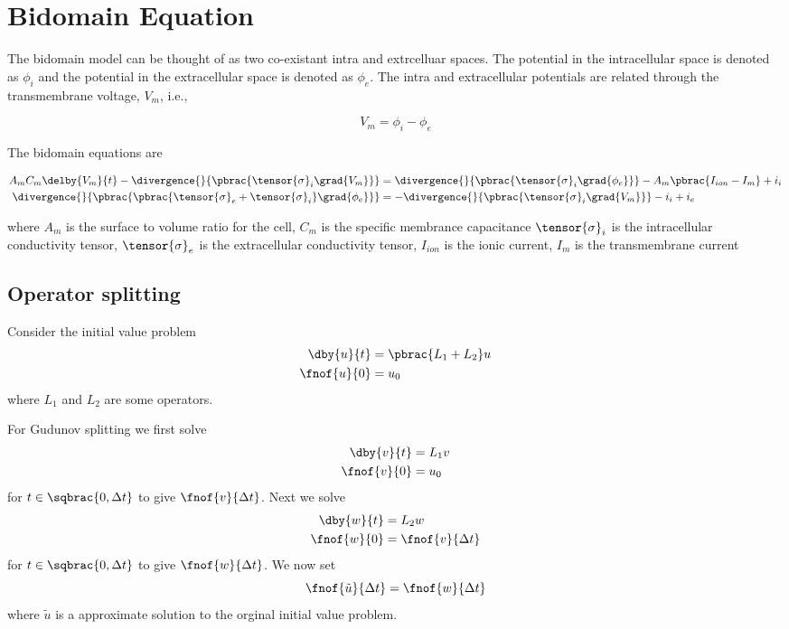 \section{Bidomain Equation}
\label{sec:Bidomain}

The bidomain model can be thought of as two co-existant intra and extrcelluar
spaces. The potential in the intracellular space is denoted as
$\phi_{i}$ and the potential in the extracellular space is denoted as
$\phi_{e}$. The intra and extracellular potentials are related through the
transmembrane voltage, $V_{m}$, i.e.,

\begin{equation}
  V_{m}=\phi_{i}-\phi_{e}
  \label{eqn:transmembranevoltage}
\end{equation} 

The bidomain equations are

\begin{align}
  A_{m}C_{m}\delby{V_{m}}{t}-\divergence{}{\pbrac{\tensor{\sigma}_{i}\grad{V_{m}}}}&=\divergence{}{\pbrac{\tensor{\sigma}_{i}\grad{\phi_{e}}}}-A_{m}\pbrac{I_{ion}-I_{m}}+i_{i} \label{eqn:bidomain1}
  \\
  \divergence{}{\pbrac{\pbrac{\tensor{\sigma}_{e}+\tensor{\sigma}_{i}}\grad{\phi_{e}}}}&=-\divergence{}{\pbrac{\tensor{\sigma}_{i}\grad{V_{m}}}}-i_{i}+i_{e}
  \label{eqn:bidomain2}
\end{align}

where $A_{m}$ is the surface to volume ratio for the cell, $C_{m}$ is
the specific membrance capacitance $\tensor{\sigma}_{i}$ is the intracellular
conductivity tensor, $\tensor{\sigma}_{e}$ is the extracellular
conductivity tensor, $I_{ion}$ is the ionic current, $I_{m}$ is the
transmembrane current

\subsection{Operator splitting}

Consider the initial value problem
\begin{align}
  \dby{u}{t}&=\pbrac{L_{1}+L_{2}}u \\
  \fnof{u}{0}&=u_{0}
\end{align}
where $L_{1}$ and $L_{2}$ are some operators.

For Gudunov splitting we first solve
\begin{align}
  \dby{v}{t}&=L_{1}v \\
  \fnof{v}{0}&=u_{0}
\end{align}
for $t\in\sqbrac{0,\Delta t}$ to give $\fnof{v}{\Delta t}$. Next we solve
\begin{align}
  \dby{w}{t}&=L_{2}w \\
  \fnof{w}{0}&=\fnof{v}{\Delta t}
\end{align}
for $t\in\sqbrac{0,\Delta t}$ to give $\fnof{w}{\Delta t}$. We now set
\begin{equation}
\fnof{\tilde{u}}{\Delta t}=\fnof{w}{\Delta t}
\end{equation}
where $\tilde{u}$ is a approximate solution to the orginal initial value
problem.

